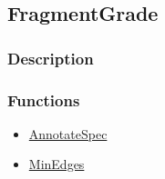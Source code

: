 \subsection{FragmentGrade}\label{FragmentGrade}
\subsubsection{Description}


\subsubsection{Functions}
\begin{itemize}
\item \hyperref[AnnotateSpec]{AnnotateSpec}
\item \hyperref[MinEdges]{MinEdges}
\end{itemize}


